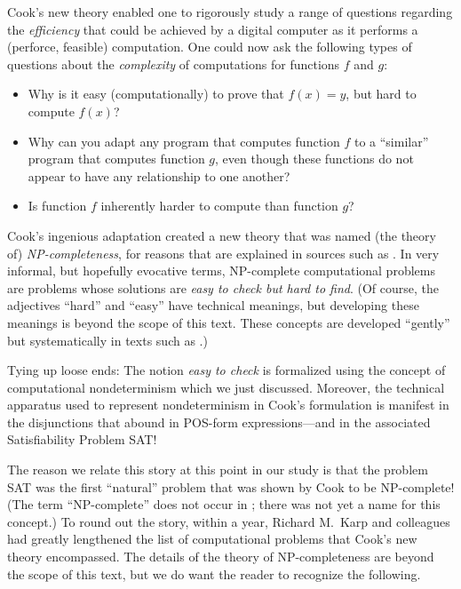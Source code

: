 {\noindent
Cook's new theory enabled one to rigorously study a range of questions regarding the {\em efficiency} that could be achieved by a digital computer as it performs a (perforce, feasible) computation.  One could now ask the following types of questions about the {\em complexity} of computations for functions $f$ and $g$:
\begin{itemize}
\item
Why is it easy (computationally) to prove that $f(x) = y$, but hard to compute $f(x)$?
\medskip\item
Why can you adapt any program that computes function $f$ to a ``similar'' program that computes function $g$, even though these functions do not appear to have any relationship to one another?
\medskip\item
Is function $f$ inherently harder to compute than function $g$?
\end{itemize}
Cook's ingenious adaptation created a new theory that was named (the theory of) {\it {\sf NP}-completeness}, for reasons that are explained in sources such as \cite{GareyJ79}.  In very informal, but hopefully evocative terms, {\sf NP}-complete computational problems are problems whose solutions are {\em easy to check but hard to find}.  (Of course, the adjectives ``hard'' and ``easy'' have technical meanings, but developing these meanings is beyond the scope of this text.  These concepts are developed ``gently'' but systematically in texts such as \cite{Rosenberg09}.)

\medskip

Tying up loose ends: The notion {\em easy to check} is formalized using the concept of computational nondeterminism which we just discussed.  Moreover, the technical apparatus used to represent nondeterminism in Cook's formulation is manifest in the disjunctions that abound in POS-form expressions---and in the associated Satisfiability Problem {\sf SAT}!


\smallskip

The reason we relate this story at this point in our study is that the problem {\sf SAT} was the first ``natural'' problem that was shown by Cook to be {\sf NP}-complete!  (The term ``{\sf NP}-complete'' does not occur in \cite{Cook71}; there was not yet a name for this concept.)  To round
out the story, within a year, Richard M.~Karp  and colleagues had greatly lengthened the list of computational problems that Cook's new theory encompassed.  The details of the theory of {\sf NP}-completeness are beyond the scope of this text, but we do want the reader to recognize the following.

}
